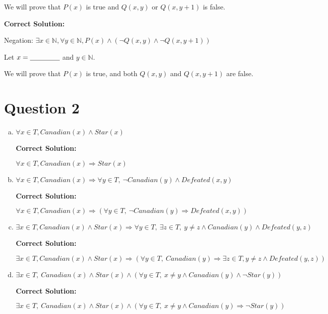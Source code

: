 \documentclass[12pt]{article}
\begin{document}
\begin{enumerate}[a.]
    We will prove that $P(x)$ is true and $Q(x,y)$ or $Q(x, y+1)$ is false.

    \bigskip

    \textbf{Correct Solution:}

    Negation: $\exists x \in \mathbb{N}, \forall y \in \mathbb{N}, P(x) \land
    (\neg Q(x,y) \land \neg Q(x,y+1))$

    \bigskip

    Let $x = \underline{\hspace{1.5cm}}$ and $y \in \mathbb{N}$.

    We will prove that $P(x)$ is true, and both $Q(x,y)$ and $Q(x,y+1)$ are false.

\end{enumerate}

\section*{Question 2}
\begin{enumerate}[a.]
    \item

    $\forall x \in T, Canadian(x) \land Star(x)$

    \bigskip

    \textbf{Correct Solution:}

    $\forall x \in T, Canadian(x) \Rightarrow Star(x)$

    \item

    $\forall x \in T, Canadian(x) \Rightarrow \forall y \in T,\:\neg Canadian(y) \land Defeated(x,y)$

    \bigskip

    \textbf{Correct Solution:}

    $\forall x \in T, Canadian(x) \Rightarrow (\forall y \in T,\:\neg Canadian(y) \Rightarrow Defeated(x,y))$

    \item

    $\exists x \in T, Canadian(x) \land Star(x) \Rightarrow \forall y \in T,\:
    \exists z \in T,\: y \neq z \land Canadian(y) \land Defeated(y,z)$

    \bigskip

    \textbf{Correct Solution:}

    $\exists x \in T, Canadian(x) \land Star(x) \Rightarrow (\forall y \in T,\:
    Canadian(y) \Rightarrow \exists z \in T, y \neq z \land Defeated(y,z))$

    \item

    $\exists x \in T,\:Canadian(x) \land Star(x) \land (\forall y \in T,\: x \neq y
    \land Canadian(y) \land \neg Star(y))$

    \textbf{Correct Solution:}

    $\exists x \in T,\:Canadian(x) \land Star(x) \land (\forall y \in T,\: x \neq y
    \land Canadian(y) \Rightarrow \neg Star(y))$

\end{enumerate}
\end{document}

